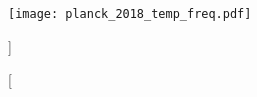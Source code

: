 \begin{figure}[htpb]
	\centering\capstart{}
	\texttt{[image: planck\_2018\_temp\_freq.pdf]}
	\caption[

	]{

	}\label{fig:chapter2_planck_frequency}
\end{figure}
